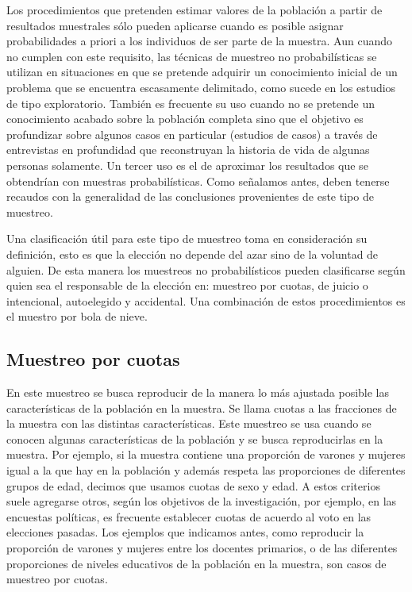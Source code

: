 \documentclass[]{book}
\begin{document}
Los procedimientos que pretenden estimar valores de la población a
partir de resultados muestrales sólo pueden aplicarse cuando es posible
asignar probabilidades a priori a los individuos de ser parte de la
muestra. Aun cuando no cumplen con este requisito, las técnicas de
muestreo no probabilísticas se utilizan en situaciones en que se
pretende adquirir un conocimiento inicial de un problema que se
encuentra escasamente delimitado, como sucede en los estudios de tipo
exploratorio. También es frecuente su uso cuando no se pretende un
conocimiento acabado sobre la población completa sino que el objetivo es
profundizar sobre algunos casos en particular (estudios de casos) a
través de entrevistas en profundidad que reconstruyan la historia de
vida de algunas personas solamente. Un tercer uso es el de aproximar los
resultados que se obtendrían con muestras probabilísticas. Como
señalamos antes, deben tenerse recaudos con la generalidad de las
conclusiones provenientes de este tipo de muestreo.

Una clasificación útil para este tipo de muestreo toma en consideración
su definición, esto es que la elección no depende del azar sino de la
voluntad de alguien. De esta manera los muestreos no probabilísticos
pueden clasificarse según quien sea el responsable de la elección en:
muestreo por cuotas, de juicio o intencional, autoelegido y accidental.
Una combinación de estos procedimientos es el muestro por bola de nieve.

\hypertarget{muestreo-por-cuotas}{%
\subsection{Muestreo por cuotas}\label{muestreo-por-cuotas}}

En este muestreo se busca reproducir de la manera lo más ajustada
posible las características de la población en la muestra. Se llama
cuotas a las fracciones de la muestra con las distintas características.
Este muestreo se usa cuando se conocen algunas características de la
población y se busca reproducirlas en la muestra. Por ejemplo, si la
muestra contiene una proporción de varones y mujeres igual a la que hay
en la población y además respeta las proporciones de diferentes grupos
de edad, decimos que usamos cuotas de sexo y edad. A estos criterios
suele agregarse otros, según los objetivos de la investigación, por
ejemplo, en las encuestas políticas, es frecuente establecer cuotas de
acuerdo al voto en las elecciones pasadas. Los ejemplos que indicamos
antes, como reproducir la proporción de varones y mujeres entre los
docentes primarios, o de las diferentes proporciones de niveles
educativos de la población en la muestra, son casos de muestreo por
cuotas.
\end{document}
